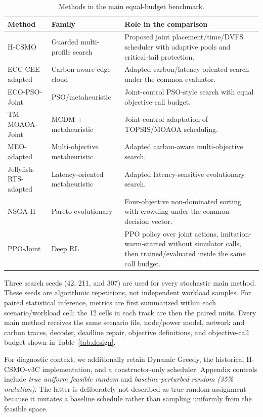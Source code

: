\documentclass[preprint,12pt]{elsarticle}
\newcommand{\method}{H-CSMO\xspace}
\begin{document}
\begin{table}[t]
\centering
\caption{Methods in the main equal-budget benchmark.}
\label{tab:baselines}
\scriptsize
\setlength{\tabcolsep}{4pt}
\begin{tabularx}{\textwidth}{p{2.7cm}p{2.8cm}Y}
\toprule
Method & Family & Role in the comparison \\
\midrule
\method & Guarded multi-profile search & Proposed joint placement/time/DVFS scheduler with adaptive pools and critical-tail protection. \\
ECC-CEE-adapted \cite{zhai2024edge} & Carbon-aware edge--cloud & Adapted carbon/latency-oriented search under the common evaluator. \\
ECO-PSO-Joint \cite{pournazari2025multi} & PSO/metaheuristic & Joint-control PSO-style search with equal objective-call budget. \\
TM-MOAOA-Joint \cite{khaledian2025tm} & MCDM + metaheuristic & Joint-control adaptation of TOPSIS/MOAOA scheduling. \\
MEO-adapted \cite{pournazari2025carbon} & Multi-objective metaheuristic & Adapted carbon-aware multi-objective search. \\
Jellyfish-RTS-adapted \cite{nigade2024inference} & Latency-oriented metaheuristic & Adapted latency-sensitive evolutionary search. \\
NSGA-II \cite{deb2002nsga2} & Pareto evolutionary & Four-objective non-dominated sorting with crowding under the common decision vector. \\
PPO-Joint \cite{schulman2017ppo} & Deep RL & PPO policy over joint actions, imitation-warm-started without simulator calls, then trained/evaluated inside the same call budget. \\
\bottomrule
\end{tabularx}
\end{table}

Three search seeds (42, 211, and 307) are used for every stochastic main method. These seeds are algorithmic repetitions, not independent workload samples. For paired statistical inference, metrics are first summarized within each scenario/workload cell; the 12 cells in each track are then the paired units. Every main method receives the same scenario file, node/power model, network and carbon traces, decoder, deadline repair, objective definitions, and objective-call budget shown in Table~\ref{tab:design}.

For diagnostic context, we additionally retain Dynamic Greedy, the historical H-CSMO-v3C implementation, and a constructor-only scheduler. Appendix controls include \emph{true uniform feasible random} and \emph{baseline-perturbed random (35\% mutation)}. The latter is deliberately not described as true random assignment because it mutates a baseline schedule rather than sampling uniformly from the feasible space.
\end{document}
